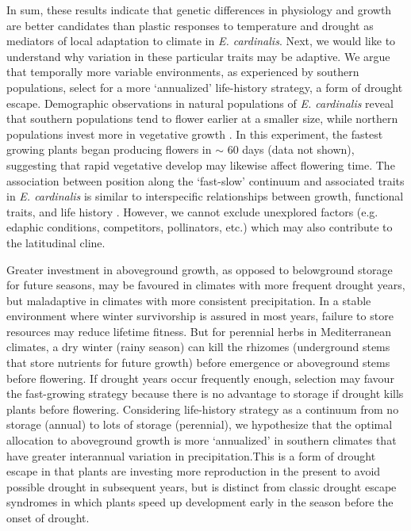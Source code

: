 \documentclass[11pt, oneside]{article}
\begin{document}
In sum, these results indicate that genetic differences in physiology and growth are better candidates than plastic responses to temperature and drought as mediators of local adaptation to climate in \textit{E. cardinalis}. Next, we would like to understand why variation in these particular traits may be adaptive. We argue that temporally more variable environments, as experienced by southern populations, select for a more `annualized' life-history strategy, a form of drought escape. Demographic observations in natural populations of \textit{E. cardinalis} reveal that southern populations tend to flower earlier at a smaller size, while northern populations invest more in vegetative growth \citep{Sheth_Angert_2017}. In this experiment, the fastest growing plants began producing flowers in $\sim$ 60 days (data not shown), suggesting that rapid vegetative develop may likewise affect flowering time. The association between position along the `fast-slow' continuum and associated traits in \textit{E. cardinalis} is similar to interspecific relationships between growth, functional traits, and life history \citep{Adler_etal_2014, Salguero-Gomez_etal_2016}. However, we cannot exclude unexplored factors (e.g. edaphic conditions, competitors, pollinators, etc.) which may also contribute to the latitudinal cline. 

Greater investment in aboveground growth, as opposed to belowground storage for future seasons, may be favoured in climates with more frequent drought years, but maladaptive in climates with more consistent precipitation. In a stable environment where winter survivorship is assured in most years, failure to store resources may reduce lifetime fitness. But for perennial herbs in Mediterranean climates, a dry winter (rainy season) can kill the rhizomes (underground stems that store nutrients for future growth) before emergence or aboveground stems before flowering. If drought years occur frequently enough, selection may favour the fast-growing strategy because there is no advantage to storage if drought kills plants before flowering. Considering life-history strategy as a continuum from no storage (annual) to lots of storage (perennial), we hypothesize that the optimal allocation to aboveground growth is more `annualized' in southern climates that have greater interannual variation in precipitation.This is a form of drought escape in that plants are investing more reproduction in the present to avoid possible drought in subsequent years, but is distinct from classic drought escape syndromes in which plants speed up development early in the season before the onset of drought. 
\end{document}
